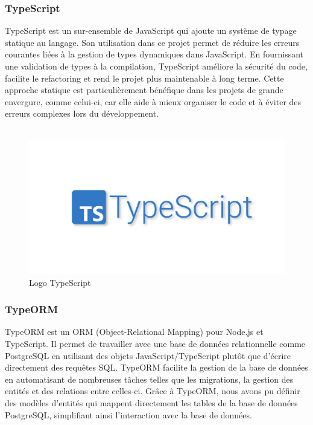 \subsubsection*{TypeScript}
TypeScript est un sur-ensemble de JavaScript qui ajoute un système de typage statique au langage. Son utilisation dans ce projet permet de réduire les erreurs courantes liées à la gestion de types dynamiques dans JavaScript. En fournissant une validation de types à la compilation, TypeScript améliore la sécurité du code, facilite le refactoring et rend le projet plus maintenable à long terme. Cette approche statique est particulièrement bénéfique dans les projets de grande envergure, comme celui-ci, car elle aide à mieux organiser le code et à éviter des erreurs complexes lors du développement.\\\\

\begin{figure}[H]
\begin{center}
\includegraphics[width=15.5cm]{assets/presentation/TypeScript.jpg}
\end{center}
\caption{Logo TypeScript}
\end{figure}

\subsubsection*{TypeORM}
TypeORM est un ORM (Object-Relational Mapping) pour Node.js et TypeScript. Il permet de travailler avec une base de données relationnelle comme PostgreSQL en utilisant des objets JavaScript/TypeScript plutôt que d'écrire directement des requêtes SQL. TypeORM facilite la gestion de la base de données en automatisant de nombreuses tâches telles que les migrations, la gestion des entités et des relations entre celles-ci. Grâce à TypeORM, nous avons pu définir des modèles d'entités qui mappent directement les tables de la base de données PostgreSQL, simplifiant ainsi l'interaction avec la base de données.\\\\

